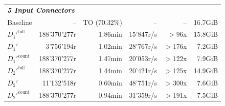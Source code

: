 \begin{longtable}{lrrrrr}
    \multicolumn{6}{l}{\textit{\textbf{5 Input Connectors}}} \\
    \nopagebreak
    Baseline              &  --                   &  TO (70.32\%)       &  --                 & --                & 16.7GiB   \\
    $D_1'^{\text{full}}$   &  188'370'277r         &  1.86min            &  15'847r/s          & $>$96x            & 15.8GiB   \\
    \quad $D_1'$           &  3'756'194r           &  1.02min            &  28'767r/s          & $>$176x           & 7.2GiB   \\
    $D_1'^{\text{count}}$  &  188'370'277r         &  1.47min            &  20'053r/s          & $>$122x           & 7.9GiB   \\
    $D_2'^{\text{full}}$   &  188'370'277r         &  1.44min            &  20'421r/s          & $>$125x           & 14.9GiB   \\
    \quad $D_2'$           &  11'132'518r          &  0.60min            &  48'751r/s          & $>$300x           & 7.6GiB    \\
    $D_2'^{\text{count}}$  &  188'370'277r         &  0.94min            &  31'359r/s          & $>$191x           & 7.5GiB    \\

    \bottomrule

\end{longtable}


